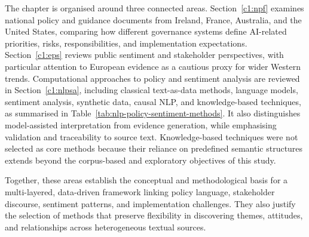 The chapter is organised around three connected areas. Section~\ref{c1:npf} examines
national policy and guidance documents from Ireland, France, Australia, and the
United States, comparing how different governance systems define AI-related
priorities, risks, responsibilities, and implementation expectations.
Section~\ref{c1:eps} reviews public sentiment and stakeholder perspectives, with
particular attention to European evidence as a cautious proxy for wider Western
trends. Computational approaches to policy and sentiment analysis are reviewed in
Section~\ref{c1:nlpsa}, including classical text-as-data methods, language models,
sentiment analysis, synthetic data, causal NLP, and knowledge-based techniques, as
summarised in Table~\ref{tab:nlp-policy-sentiment-methods}. It also distinguishes
model-assisted interpretation from evidence generation, while emphasising validation
and traceability to source text. Knowledge-based techniques were not selected as core
methods because their reliance on predefined semantic structures extends beyond the
corpus-based and exploratory objectives of this study.


Together, these areas establish the conceptual and methodological basis for a
multi-layered, data-driven framework linking policy language, stakeholder discourse,
sentiment patterns, and implementation challenges. They also justify the selection of
methods that preserve flexibility in discovering themes, attitudes, and relationships
across heterogeneous textual sources.

